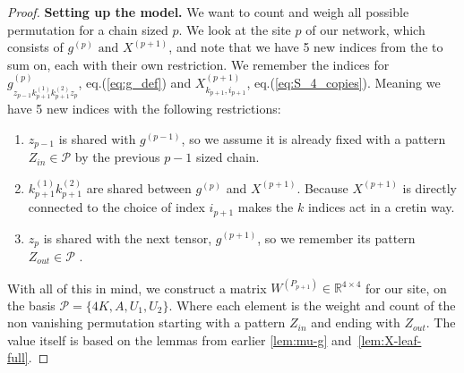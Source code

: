 \documentclass[12pt,a4paper]{article}
\newcommand{\R}{\mathbb{R}}
\begin{document}
\begin{proof}
\textbf{Setting up the model.} 
We want to count and weigh all possible permutation for a chain sized $p$. We look at the site $p$ of our network, which consists of $g^{(p)} \text{ and } X^{(p+1)}$, and note that we have 5 new indices from the to sum on, each with their own restriction. 
We remember the indices for $g_{z_{p-1}k_{p+1}^{(1)}k_{p+1}^{(2)}z_{p}}^{(p)}$, eq.(\ref{eq:g_def}) and $X^{(p+1)}_{k_{p+1},i_{p+1}}$, eq.(\ref{eq:S_4_copies}). 
Meaning we have 5 new indices with the following restrictions:
\begin{enumerate}
    \item $z_{p-1}$  is shared with $g^{(p-1)}$, so we assume it is already fixed with a pattern $Z_{in}\in \mathcal{P}$   by the previous $p-1$  sized chain.
    \item $k_{p+1}^{(1)}k_{p+1}^{(2)}$  are shared between $g^{(p)}$  and $X^{(p+1)}$. Because $X^{(p+1)}$  is directly connected to the choice of index $i_{p+1}$ makes the $k$  indices act in a cretin way.
    \item $z_p$  is shared with the next tensor, $g^{(p+1)}$, so we remember its pattern $Z_{out}\in\mathcal{P}$ .
\end{enumerate}

With all of this in mind, we construct a matrix $W^{(P_{p+1})}\in \R^{4\times 4}$ for our site, on the basis $\mathcal{P}=\{4K,A,U_1,U_2\}$. Where each element is the weight and count of the non vanishing permutation starting with a pattern $Z_{in}$  and ending with $Z_{out}$. The value itself is based on the lemmas from earlier \ref{lem:mu-g} and~\ref{lem:X-leaf-full}.


\end{proof}
\end{document}
